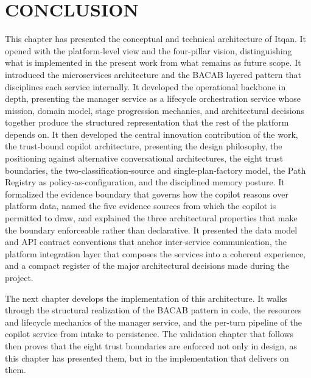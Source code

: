 \section{CONCLUSION}
This chapter has presented the conceptual and technical architecture of Itqan. It opened with the platform-level view and the four-pillar vision, distinguishing what is implemented in the present work from what remains as future scope. It introduced the microservices architecture and the BACAB layered pattern that disciplines each service internally. It developed the operational backbone in depth, presenting the manager service as a lifecycle orchestration service whose mission, domain model, stage progression mechanics, and architectural decisions together produce the structured representation that the rest of the platform depends on. It then developed the central innovation contribution of the work, the trust-bound copilot architecture, presenting the design philosophy, the positioning against alternative conversational architectures, the eight trust boundaries, the two-classification-source and single-plan-factory model, the Path Registry as policy-as-configuration, and the disciplined memory posture. It formalized the evidence boundary that governs how the copilot reasons over platform data, named the five evidence sources from which the copilot is permitted to draw, and explained the three architectural properties that make the boundary enforceable rather than declarative. It presented the data model and API contract conventions that anchor inter-service communication, the platform integration layer that composes the services into a coherent experience, and a compact register of the major architectural decisions made during the project.

The next chapter develops the implementation of this architecture. It walks through the structural realization of the BACAB pattern in code, the resources and lifecycle mechanics of the manager service, and the per-turn pipeline of the copilot service from intake to persistence. The validation chapter that follows then proves that the eight trust boundaries are enforced not only in design, as this chapter has presented them, but in the implementation that delivers on them.